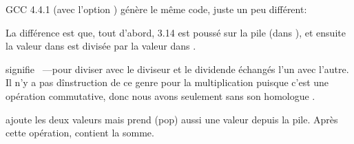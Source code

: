 
GCC 4.4.1 (avec l'option \Othree) génère le même code, juste un peu différent:



La différence est que, tout d'abord, 3.14 est poussé sur la pile (dans ), et
ensuite la valeur dans  est divisée par la valeur dans .


\FDIVR signifie ~---pour diviser avec le diviseur et le dividende
échangés l'un avec l'autre.
Il n'y a pas dînstruction de ce genre pour la multiplication puisque c'est une opération
commutative, donc nous avons seulement \FMUL sans son homologue .


\FADDP ajoute les deux valeurs mais prend (pop) aussi une valeur depuis la pile.
Après cette opération,  contient la somme.

